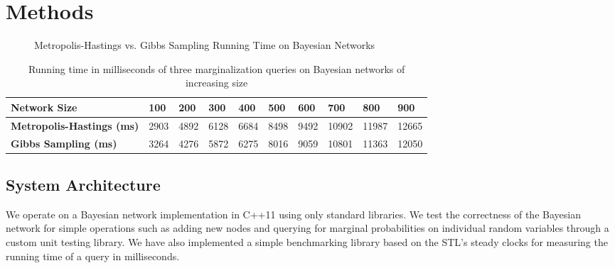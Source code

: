 \documentclass{sig-alternate}
\begin{document}
\section{Methods} %
\label{sec:Methods}
	\begin{figure}[!htbp]
		\centering
	\label{fig:results}
	\caption{Metropolis-Hastings vs. Gibbs Sampling Running Time on Bayesian Networks}
	\end{figure}

	\begin{table*}[ht]
		\centering
		\begin{tabular}{|l|l|l|l|l|l|l|l|l|l|}
		\hline
		\textbf{Network Size}
			& 100 & 200 & 300 & 400 & 500 & 600 & 700 & 800 & 900 \\\hline
		\textbf{Metropolis-Hastings (ms)} 
			& 2903 & 4892 & 6128 & 6684 & 8498 & 9492 & 10902 & 11987 &12665 \\\hline 
		\textbf{Gibbs Sampling (ms)} 
			& 3264 & 4276 & 5872 & 6275 & 8016 & 9059 & 10801 & 11363 & 12050 \\\hline
		\end{tabular}
		\label{tab:running_time}
		\caption{Running time in milliseconds of three marginalization queries
		on Bayesian networks of increasing size}
	\end{table*}

	\subsection{System Architecture} %
	\label{sub:System Architecture}
		We operate on a Bayesian network implementation in C++11 using only standard
		libraries. We test the correctness of the Bayesian network for simple operations
		such as adding new nodes and querying for marginal probabilities on individual
		random variables through a custom unit testing library. We have also
		implemented a simple benchmarking library based on the STL's steady
		clocks for measuring the running time of a query in milliseconds.
\end{document}
